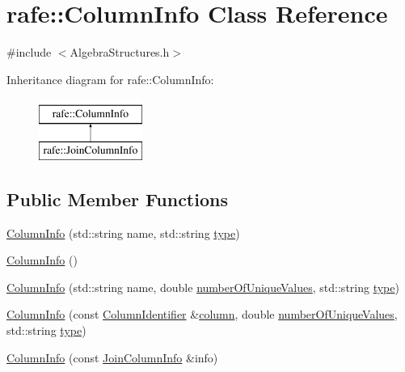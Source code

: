 \hypertarget{classrafe_1_1_column_info}{\section{rafe\+:\+:Column\+Info Class Reference}
\label{classrafe_1_1_column_info}
}


{\ttfamily \#include $<$Algebra\+Structures.\+h$>$}

Inheritance diagram for rafe\+:\+:Column\+Info\+:\begin{figure}[H]
\begin{center}
\leavevmode
\includegraphics[height=2.000000cm]{classrafe_1_1_column_info}
\end{center}
\end{figure}
\subsection*{Public Member Functions}
\begin{DoxyCompactItemize}
\item 
\hyperlink{classrafe_1_1_column_info_a7b8526771896d312ac4329592fe85f73}{Column\+Info} (std\+::string name, std\+::string \hyperlink{classrafe_1_1_column_info_a22fd355567e1d07f30fd1deae721577f}{type})
\item 
\hyperlink{classrafe_1_1_column_info_a7002d12c04ff1acb398f01b09b3f9297}{Column\+Info} ()
\item 
\hyperlink{classrafe_1_1_column_info_af1b1e671898270d7cd905860297a1707}{Column\+Info} (std\+::string name, double \hyperlink{classrafe_1_1_column_info_a3925986dda2c3385a512d6491e282aae}{number\+Of\+Unique\+Values}, std\+::string \hyperlink{classrafe_1_1_column_info_a22fd355567e1d07f30fd1deae721577f}{type})
\item 
\hyperlink{classrafe_1_1_column_info_a2a9a69f1dfc6a40b2effb352887acba0}{Column\+Info} (const \hyperlink{classrafe_1_1_column_identifier}{Column\+Identifier} \&\hyperlink{classrafe_1_1_column_info_a446710a3a03b249da265a785aff1ee18}{column}, double \hyperlink{classrafe_1_1_column_info_a3925986dda2c3385a512d6491e282aae}{number\+Of\+Unique\+Values}, std\+::string \hyperlink{classrafe_1_1_column_info_a22fd355567e1d07f30fd1deae721577f}{type})
\item 
\hyperlink{classrafe_1_1_column_info_a8e4ca4421d5c611b689421e0feca1114}{Column\+Info} (const \hyperlink{classrafe_1_1_join_column_info}{Join\+Column\+Info} \&info)
\end{DoxyCompactItemize}
